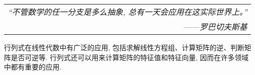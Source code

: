 \begin{flushright}
    \begin{tabular}{r||}
        \textit{“不管数学的任一分支是多么抽象, 总有一天会应用在这实际世界上。”}\\
        ——\textit{罗巴切夫斯基}
    \end{tabular}
\end{flushright}

行列式在线性代数中有广泛的应用, 包括求解线性方程组、计算矩阵的逆、判断矩阵是否可逆等. 行列式还可以用来计算矩阵的特征值和特征向量, 因而在许多领域中都有重要的应用. 
